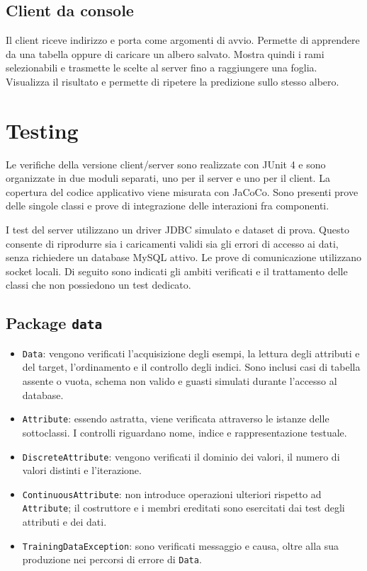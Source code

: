 \documentclass[11pt,a4paper]{article}
\begin{document}
\subsection*{Client da console}

Il client riceve indirizzo e porta come argomenti di avvio. Permette di apprendere
da una tabella oppure di caricare un albero salvato. Mostra quindi i rami
selezionabili e trasmette le scelte al server fino a raggiungere una foglia.
Visualizza il risultato e permette di ripetere la predizione sullo stesso albero.

\clearpage
\section*{Testing}

Le verifiche della versione client/server sono realizzate con JUnit 4 e sono
organizzate in due moduli separati, uno per il server e uno per il client.
La copertura del codice applicativo viene misurata con JaCoCo. Sono presenti
prove delle singole classi e prove di integrazione delle interazioni fra
componenti.

I test del server utilizzano un driver JDBC simulato e dataset di prova. Questo
consente di riprodurre sia i caricamenti validi sia gli errori di accesso ai dati,
senza richiedere un database MySQL attivo. Le prove di comunicazione utilizzano
socket locali. Di seguito sono indicati gli ambiti verificati e il trattamento
delle classi che non possiedono un test dedicato.

\subsection*{Package \texttt{data}}

\begin{itemize}
  \item \texttt{Data}: vengono verificati l'acquisizione degli esempi, la lettura
        degli attributi e del target, l'ordinamento e il controllo degli indici.
        Sono inclusi casi di tabella assente o vuota, schema non valido e guasti
        simulati durante l'accesso al database.
  \item \texttt{Attribute}: essendo astratta, viene verificata attraverso le
        istanze delle sottoclassi. I controlli riguardano nome, indice e
        rappresentazione testuale.
  \item \texttt{DiscreteAttribute}: vengono verificati il dominio dei valori,
        il numero di valori distinti e l'iterazione.
  \item \texttt{ContinuousAttribute}: non introduce operazioni ulteriori rispetto
        ad \texttt{Attribute}; il costruttore e i membri ereditati sono esercitati
        dai test degli attributi e dei dati.
  \item \texttt{TrainingDataException}: sono verificati messaggio e causa,
        oltre alla sua produzione nei percorsi di errore di \texttt{Data}.
\end{itemize}
\end{document}
